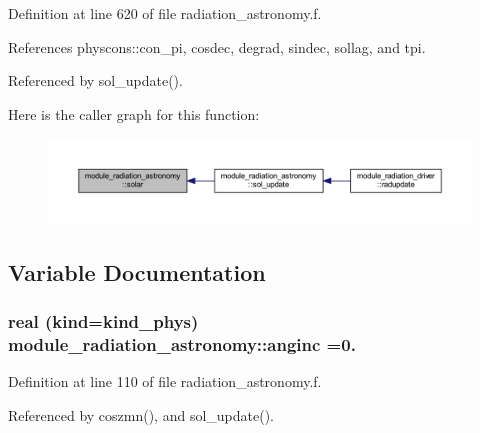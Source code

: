 Definition at line 620 of file radiation\+\_\+astronomy.\+f.



References physcons\+::con\+\_\+pi, cosdec, degrad, sindec, sollag, and tpi.



Referenced by sol\+\_\+update().



Here is the caller graph for this function\+:\nopagebreak
\begin{figure}[H]
\begin{center}
\leavevmode
\includegraphics[width=350pt]{namespacemodule__radiation__astronomy_a3c99615d1cda89bcdb5ea1af3bca9d6f_icgraph}
\end{center}
\end{figure}




\subsection{Variable Documentation}
\subsubsection[{\texorpdfstring{anginc}{anginc}}]{\setlength{\rightskip}{0pt plus 5cm}real (kind=kind\+\_\+phys) module\+\_\+radiation\+\_\+astronomy\+::anginc =0.\hspace{0.3cm}{\ttfamily [private]}}\hypertarget{namespacemodule__radiation__astronomy_a723159a44491e4ae974128123a1e8dcd}{}\label{namespacemodule__radiation__astronomy_a723159a44491e4ae974128123a1e8dcd}


Definition at line 110 of file radiation\+\_\+astronomy.\+f.



Referenced by coszmn(), and sol\+\_\+update().

